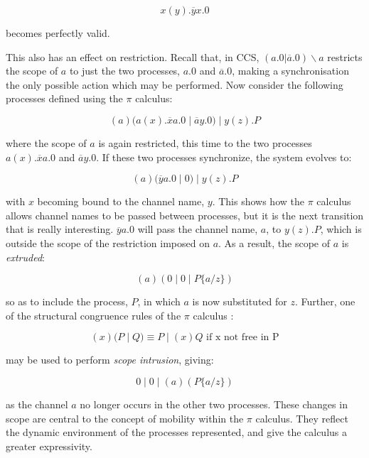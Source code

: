 \begin{equation}
x(y).\overline{y}x.0
\end{equation}

\noindent becomes perfectly valid.

This also has an effect on restriction.  Recall that, in CCS,
$(a.0|\overline{a}.0)\backslash a$ restricts the scope of $a$ to just
the two processes, $a.0$ and $\overline{a}.0$, making a synchronisation
the only possible action which may be performed.  Now consider the
following processes defined using the $\pi$ calculus:

\begin{equation}
(a)(a(x).\overline{x}a.0\;|\;\overline{a}y.0)\;|\;y(z).P
\end{equation}

\noindent where the scope of $a$ is again restricted, this time to the
two processes $a(x).\overline{x}a.0$ and $\overline{a}y.0$.  If these
two processes synchronize, the system evolves to:

\begin{equation}
(a)(\overline{y}a.0\;|\;0)\;|\;y(z).P
\end{equation}

\noindent with $x$ becoming bound to the channel name, $y$.  This shows
how the $\pi$ calculus allows channel names to be passed between
processes, but it is the next transition that is really interesting.
$\overline{y}a.0$ will pass the channel name, $a$, to $y(z).P$, which is
outside the scope of the restriction imposed on $a$.  As a result, the
scope of $a$ is \emph{extruded}:

\begin{equation}
(a)(0\;|\;0\;|\;P\{a/z\})
\end{equation}

\noindent so as to include the process, $P$, in which $a$ is now
substituted for $z$.  Further, one of the structural congruence rules of
the $\pi$ calculus \cite{funcproc}:

\begin{equation}
(x)(P\;|\;Q) \equiv P\;|\;(x)Q\text{ if x not free in P}
\end{equation}

\noindent may be used to perform \emph{scope intrusion}, giving:

\begin{equation}
0\;|\;0\;|\;(a)(P\{a/z\})
\end{equation}

\noindent as the channel $a$ no longer occurs in the other two
processes.  These changes in scope are central to the concept of
mobility within the $\pi$ calculus.  They reflect the dynamic
environment of the processes represented, and give the calculus a
greater expressivity.

